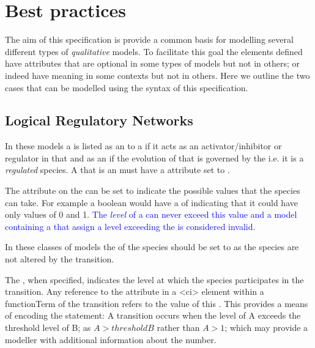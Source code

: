 
\section{Best practices}
\label{best-practices}

The aim of this specification is provide a common basis for modelling several different types of \textit{qualitative} models. To facilitate this goal the elements defined have attributes that are optional in some types of models but not in others; or indeed have meaning in some contexts but not in others.  Here we outline the two cases that can be modelled using the syntax of this specification.

\subsection{Logical Regulatory Networks}

In these models a \QualitativeSpecies is listed as an \Input to a \Transition if it acts as an activator/inhibitor or regulator in that \Transition and as an \Output if the evolution of that \QualitativeSpecies is governed by the \Transition i.e. it is a \textit{regulated} species. A \QualitativeSpecies that is an \Output must have a  attribute set to .

The  attribute on the \QualitativeSpecies can be set to indicate the possible values that the species can take. For example a boolean would have a  of  indicating that it could have only values of 0 and 1. \textcolor{blue}{The \emph{level} of a \QualitativeSpecies can never exceed this value and a model containing a \FunctionTerm that assign a level exceeding the  is considered invalid.}


In these classes of models the  of the \Input species should be set to  as the \Input species are not altered by the transition.


The , when specified, indicates the level at which the species participates in the transition. Any reference to the \Input {} attribute in a <ci> element within a functionTerm of the transition refers to the value of this . This provides a means of encoding the statement: A transition occurs when the level of A exceeds the threshold level of B; as $A > thresholdB$ rather than $A > 1$; which may provide a modeller with additional information about the number.


